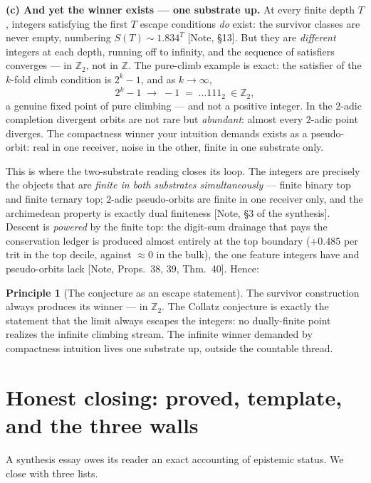 \documentclass[11pt]{article}
\theoremstyle{definition}
\newtheorem{principle}[theorem]{Principle}
\theoremstyle{remark}
\newcommand{\anchor}[1]{\textup{[#1]}}
\newcommand{\Z}{\mathbb{Z}}
\newcommand{\Ztwo}{\mathbb{Z}_2}
\begin{document}
\textbf{(c) And yet the winner exists --- one substrate up.} At every finite
depth $T$, integers satisfying the first $T$ escape conditions \emph{do}
exist: the survivor classes are never empty, numbering $S(T) \sim 1.834^T$
\anchor{Note, \S13}. But they are \emph{different} integers at each depth,
running off to infinity, and the sequence of satisfiers converges --- in
$\Ztwo$, not in $\Z$. The pure-climb example is exact: the satisfier of the
$k$-fold climb condition is $2^k - 1$, and as $k \to \infty$,
\[
2^k - 1 \;\longrightarrow\; -1 \;=\; \ldots 111_2 \ \in \Ztwo,
\]
a genuine fixed point of pure climbing --- and not a positive integer. In the
$2$-adic completion divergent orbits are not rare but \emph{abundant}: almost
every $2$-adic point diverges. The compactness winner your intuition demands
exists as a pseudo-orbit: real in one receiver, noise in the other, finite in
one substrate only.

This is where the two-substrate reading closes its loop. The integers are
precisely the objects that are \emph{finite in both substrates
simultaneously} --- finite binary top and finite ternary top; $2$-adic
pseudo-orbits are finite in one receiver only, and the archimedean property
is exactly dual finiteness \anchor{Note, \S3 of the synthesis}. Descent is
\emph{powered} by the finite top: the digit-sum drainage that pays the
conservation ledger is produced almost entirely at the top boundary
($+0.485$ per trit in the top decile, against $\approx 0$ in the bulk), the
one feature integers have and pseudo-orbits lack \anchor{Note, Props.~38, 39,
Thm.~40}. Hence:

\begin{principle}[The conjecture as an escape statement]
The survivor construction always produces its winner --- in $\Ztwo$. The
Collatz conjecture is exactly the statement that the limit always escapes the
integers: no dually-finite point realizes the infinite climbing stream. The
infinite winner demanded by compactness intuition lives one substrate up,
outside the countable thread.
\end{principle}

\section{Honest closing: proved, template, and the three walls}
\label{sec:closing}

A synthesis essay owes its reader an exact accounting of epistemic status.
We close with three lists.
\end{document}
